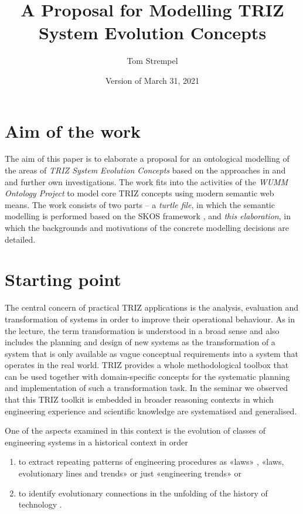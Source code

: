 \documentclass[11pt,a4paper]{article}
\title{A Proposal for Modelling TRIZ System Evolution Concepts}
\author{Tom Strempel}
\date{Version of March 31, 2021}
\begin{document}
\maketitle

\section{Aim of the work}

The aim of this paper is to elaborate a proposal for an ontological modelling
of the areas of \emph{TRIZ System Evolution Concepts} based on the approaches
in \cite{TESE2018} and \cite{Shpakovsky2016} and further own investigations.
The work fits into the activities of the \emph{WUMM Ontology Project}
\cite{WUMM} to model core TRIZ concepts using modern semantic web means.  The
work consists of two parts -- a \emph{turtle file}, in which the semantic
modelling is performed based on the SKOS framework \cite{SKOS}, and \emph{this elaboration}, in which the backgrounds and motivations of the concrete modelling decisions are detailed.

\section{Starting point} 

The central concern of practical TRIZ applications is the analysis, evaluation
and transformation of systems in order to improve their operational behaviour.
As in the lecture, the term transformation is understood in a broad sense and
also includes the planning and design of new systems as the transformation of
a system that is only available as vague conceptual requirements into a system
that operates in the real world. TRIZ provides a whole methodological toolbox
that can be used together with domain-specific concepts for the systematic
planning and implementation of such a transformation task. In the seminar we
observed that this TRIZ toolkit is embedded in broader reasoning contexts in
which engineering experience and scientific knowledge are systematised and
generalised.

One of the aspects examined in this context is the evolution of classes of
engineering systems in a historical context in order 
\begin{enumerate}
\item to extract repeating patterns of engineering procedures as «laws»
  \cite{Altshuller1979}, «laws, evolutionary lines and trends» \cite{KS} or
  just «engineering trends» \cite{TESE2018} or
\item to identify evolutionary connections in the unfolding of the history of
  technology \cite{Shpakovsky2016}.
\end{enumerate}
\end{document}
